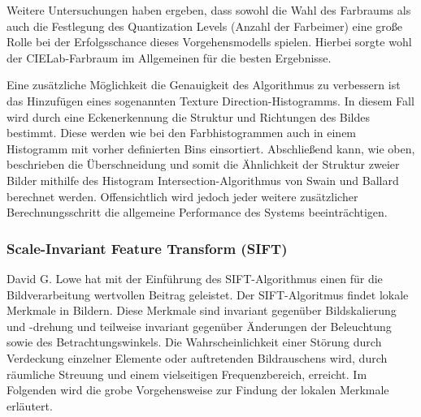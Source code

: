 \documentclass[a4paper,12pt]{article}
\begin{document}
Weitere Untersuchungen haben ergeben, dass sowohl die Wahl des Farbraums als
auch die Festlegung des Quantization Levels (Anzahl der Farbeimer) eine große
Rolle bei der Erfolgsschance dieses Vorgehensmodells spielen. Hierbei sorgte
wohl der CIELab-Farbraum im Allgemeinen für die besten Ergebnisse.

Eine zusätzliche Möglichkeit die Genauigkeit des Algorithmus zu verbessern ist
das Hinzufügen eines sogenannten \glqq{}Texture Direction\grqq{}-Histogramms. In
diesem Fall wird durch eine Eckenerkennung die Struktur und Richtungen des
Bildes bestimmt. Diese werden wie bei den Farbhistogrammen auch in einem
Histogramm mit vorher definierten Bins einsortiert. Abschließend kann, wie oben,
beschrieben die Überschneidung und somit die Ähnlichkeit der Struktur zweier
Bilder mithilfe des \glqq{}Histogram Intersection\grqq{}-Algorithmus von Swain
und Ballard berechnet werden. Offensichtlich wird jedoch jeder weitere 
zusätzlicher Berechnungsschritt die allgemeine Performance des Systems
beeinträchtigen.

\newpage

\subsubsection{Scale-Invariant Feature Transform (SIFT)}
David G. Lowe hat mit der Einführung des SIFT-Algorithmus einen für die
Bildverarbeitung wertvollen Beitrag geleistet. Der SIFT-Algoritmus findet lokale
Merkmale in Bildern. Diese Merkmale sind invariant gegenüber Bildskalierung und
-drehung und teilweise invariant gegenüber Änderungen der Beleuchtung sowie des
Betrachtungswinkels. Die Wahrscheinlichkeit einer Störung durch Verdeckung
einzelner Elemente oder auftretenden Bildrauschens wird, durch räumliche
Streuung und einem vielseitigen Frequenzbereich, erreicht. Im Folgenden wird die
grobe Vorgehensweise zur Findung der lokalen Merkmale erläutert.
\end{document}
